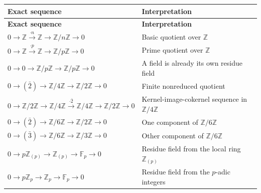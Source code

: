 \documentclass[12pt,a4paper]{article}
\theoremstyle{notespace}
\theoremstyle{definition}
\begin{document}
\begin{center}
	\renewcommand{\arraystretch}{1.35}
	\begin{longtable}{>{\raggedright\arraybackslash}p{}
			>{\raggedright\arraybackslash}p{}}
		\toprule
		\textbf{Exact sequence} & \textbf{Interpretation} \\
		\midrule
		\endfirsthead
		
		\toprule
		\textbf{Exact sequence} & \textbf{Interpretation} \\
		\midrule
		\endhead
		
		\bottomrule
		\endfoot
		
		\(
		0\to \mathbb Z \xrightarrow{\cdot n} \mathbb Z \to \mathbb Z/n\mathbb Z \to 0
		\)
		&
		Basic quotient over \(\mathbb Z\)
		\\
		
		\(
		0\to \mathbb Z \xrightarrow{\cdot p} \mathbb Z \to \mathbb Z/p\mathbb Z \to 0
		\)
		&
		Prime quotient over \(\mathbb Z\)
		\\
		
		\(
		0\to 0\to \mathbb Z/p\mathbb Z \to \mathbb Z/p\mathbb Z \to 0
		\)
		&
		A field is already its own residue field
		\\
		
		\(
		0\to (\bar 2)\to \mathbb Z/4\mathbb Z \to \mathbb Z/2\mathbb Z \to 0
		\)
		&
		Finite nonreduced quotient
		\\
		
		\(
		0\to \mathbb Z/2\mathbb Z \to \mathbb Z/4\mathbb Z \xrightarrow{\cdot \bar 2} \mathbb Z/4\mathbb Z \to \mathbb Z/2\mathbb Z \to 0
		\)
		&
		Kernel-image-cokernel sequence in \(\mathbb Z/4\mathbb Z\)
		\\
		
		\(
		0\to (\bar 2)\to \mathbb Z/6\mathbb Z \to \mathbb Z/2\mathbb Z \to 0
		\)
		&
		One component of \(\mathbb Z/6\mathbb Z\)
		\\
		
		\(
		0\to (\bar 3)\to \mathbb Z/6\mathbb Z \to \mathbb Z/3\mathbb Z \to 0
		\)
		&
		Other component of \(\mathbb Z/6\mathbb Z\)
		\\
		
		\(
		0\to p\mathbb Z_{(p)} \to \mathbb Z_{(p)} \to \mathbb F_p \to 0
		\)
		&
		Residue field from the local ring \(\mathbb Z_{(p)}\)
		\\
		
		\(
		0\to p\mathbb Z_p \to \mathbb Z_p \to \mathbb F_p \to 0
		\)
		&
		Residue field from the \(p\)-adic integers
		\\
		

\end{longtable}
\end{center}
\end{document}
